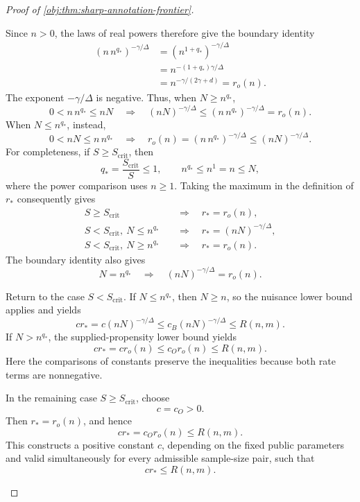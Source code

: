 \begin{proof}[Proof of \cref{obj:thm:sharp-annotation-frontier}]
\begin{enumerate}
Since \(n>0\), the laws of real powers therefore give the boundary identity
\[
\begin{aligned}
(n\,n^{q_*})^{-\gamma/\Delta}
&=(n^{1+q_*})^{-\gamma/\Delta}\\
&=n^{-(1+q_*)\gamma/\Delta}\\
&=n^{-\gamma/(2\gamma+d)}
=r_o(n).
\end{aligned}
\]
The exponent \(-\gamma/\Delta\) is negative. Thus, when \(N\ge n^{q_*}\),
\[
0<n\,n^{q_*}\le nN
\quad\Longrightarrow\quad
(nN)^{-\gamma/\Delta}
\le(n\,n^{q_*})^{-\gamma/\Delta}
=r_o(n).
\]
When \(N\le n^{q_*}\), instead,
\[
0<nN\le n\,n^{q_*}
\quad\Longrightarrow\quad
r_o(n)
=(n\,n^{q_*})^{-\gamma/\Delta}
\le(nN)^{-\gamma/\Delta}.
\]
For completeness, if \(S\ge S_{\mathrm{crit}}\), then
\[
q_*=\frac{S_{\mathrm{crit}}}{S}\le1,
\qquad
n^{q_*}\le n^1=n\le N,
\]
where the power comparison uses \(n\ge1\). Taking the maximum in the definition of \(r_*\) consequently gives
\[
\begin{aligned}
S\ge S_{\mathrm{crit}}
&\quad\Longrightarrow\quad r_*=r_o(n),\\
S<S_{\mathrm{crit}},\ N\le n^{q_*}
&\quad\Longrightarrow\quad r_*=(nN)^{-\gamma/\Delta},\\
S<S_{\mathrm{crit}},\ N\ge n^{q_*}
&\quad\Longrightarrow\quad r_*=r_o(n).
\end{aligned}
\]
The boundary identity also gives
\[
N=n^{q_*}
\quad\Longrightarrow\quad
(nN)^{-\gamma/\Delta}=r_o(n).
\]

Return to the case \(S<S_{\mathrm{crit}}\). If \(N\le n^{q_*}\), then \(N\ge n\), so the nuisance lower bound applies and yields
\[
c r_*
=c(nN)^{-\gamma/\Delta}
\le c_B(nN)^{-\gamma/\Delta}
\le R(n,m).
\]
If \(N>n^{q_*}\), the supplied-propensity lower bound yields
\[
c r_*=c r_o(n)\le c_O r_o(n)\le R(n,m).
\]
Here the comparisons of constants preserve the inequalities because both rate terms are nonnegative.

In the remaining case \(S\ge S_{\mathrm{crit}}\), choose
\[
c=c_O>0.
\]
Then \(r_*=r_o(n)\), and hence
\[
c r_*=c_O r_o(n)\le R(n,m).
\]
This constructs a positive constant \(c\), depending on the fixed public parameters and valid simultaneously for every admissible sample-size pair, such that
\[
c r_*\le R(n,m).
\]


\end{enumerate}
\end{proof}
